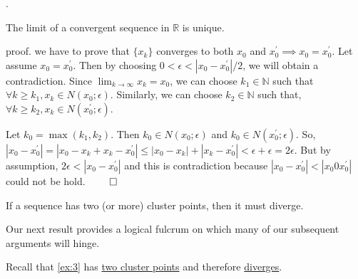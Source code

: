 \documentclass[8pt]{beamer}
\newcommand{\mbb}[1]{\mathbb{#1}}
\newcommand{\abs}[1]{\left\lvert #1 \right\rvert}
\begin{document}
\begin{frame}{.}
    \begin{theorem}
        The limit of a convergent sequence in $\mbb{R}$ is unique.

        proof. we have to prove that $\{x_k\}$ converges to both $x_0$ and $x_0^\prime \implies x_0 = x_0^\prime$.
        Let assume $x_0 = x_0^\prime$.
        Then by choosing $0 < \epsilon < \abs{x_0 - x_0^\prime}/2$, we will obtain a contradiction.
        Since $\lim_{k \to \infty} x_k = x_0$, we can choose $k_1 \in \mbb{N}$ such that $\forall k \geq k_1, x_k \in N(x_0; \epsilon)$.
        Similarly, we can choose $k_2 \in \mbb{N}$ such that, $\forall k \geq k_2, x_k \in N(x_0^\prime; \epsilon)$.

        Let $k_0 = \max(k_1, k_2)$.
        Then $k_0 \in N(x_0; \epsilon)$ and $k_0 \in N(x_0^\prime; \epsilon)$.
        So, $\abs{x_0 - x_0^\prime} = \abs{x_0 - x_k + x_k - x_0^\prime} \leq \abs{x_0 - x_k} + \abs{x_k - x_0^\prime} < \epsilon + \epsilon = 2\epsilon$.
        But by assumption, $2\epsilon < \abs{x_0 - x_0^\prime}$ and this is contradiction because $\abs{x_0 - x_0^\prime} < \abs{x_0 0 x_0^\prime}$ could not be hold.
        $\qed$
    \end{theorem}

    \begin{theorem} \label{th:6}
        If a sequence has two (or more) cluster points, then it must diverge.

        \smallskip
        Our next result provides a logical fulcrum on which many of our subsequent arguments will hinge.
    \end{theorem}

    Recall that \ref{ex:3} has \underline{two cluster points} and therefore \underline{diverges}.
    

\end{frame}
\end{document}
